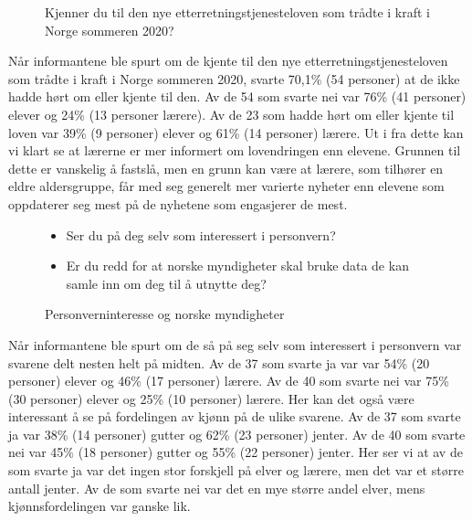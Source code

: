 \begin{figure}[H]
    \centering
    \caption{Kjenner du til den nye etterretningstjenesteloven som trådte i kraft i Norge sommeren 2020?}
    \label{fig:kjenner_loven}
\end{figure}
Når informantene ble spurt om de kjente til den nye etterretningstjenesteloven som trådte i kraft i Norge sommeren 2020, svarte 70,1\% (54 personer) at de ikke hadde hørt om eller kjente til den. Av de 54 som svarte nei var 76\% (41 personer) elever og 24\% (13 personer lærere). Av de 23 som hadde hørt om eller kjente til loven var 39\% (9 personer) elever og 61\% (14 personer) lærere. Ut i fra dette kan vi klart se at lærerne er mer informert om lovendringen enn elevene. Grunnen til dette er  vanskelig å fastslå, men en grunn kan være at lærere, som tilhører en eldre aldersgruppe, får med seg generelt mer  varierte nyheter enn elevene som oppdaterer seg mest på de nyhetene som engasjerer de mest.

\begin{figure}[H]
    \centering
    \begin{itemize}
        \item Ser du på deg selv som interessert i personvern?
        \item Er du redd for at norske myndigheter skal bruke data de kan samle inn om deg til å utnytte deg?
    \end{itemize}
    \caption{Personverninteresse og norske myndigheter}
\end{figure}
Når informantene ble spurt om de så på seg selv som interessert i personvern var svarene delt nesten helt på midten. Av de 37 som svarte ja var var 54\% (20 personer) elever og 46\% (17 personer) lærere. Av de 40 som svarte nei var 75\% (30 personer) elever og 25\% (10 personer) lærere. Her kan det også være interessant å se på fordelingen av kjønn på de ulike svarene. Av de 37 som svarte ja var 38\% (14 personer) gutter og 62\% (23 personer) jenter. Av de 40 som svarte nei var 45\% (18 personer) gutter og 55\% (22 personer) jenter. Her ser vi at av de som svarte ja var det ingen stor forskjell på elver og lærere, men det var et større antall jenter. Av de som svarte nei var det en mye større andel elver, mens kjønnsfordelingen var ganske lik. 

